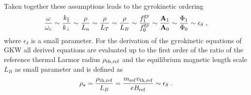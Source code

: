 Taken together these assumptions leads to the gyrokinetic ordering
\begin{gather}
	\frac{\omega}{\omega_\mathrm{c}} \sim \frac{k_\parallel}{k_\perp} \sim \frac{\rho}{L_n} \sim \frac{\rho}{L_T} \sim \frac{\rho}{L_B} \sim \frac{f^{\mathrm{gy}}_1}{f^{\mathrm{gy}}_0} \sim \frac{\boldsymbol{\mathbf{A}}_1}{\boldsymbol{\mathbf{A}}_0} \sim \frac{\Phi_1}{\Phi_0} \sim \epsilon_\delta~,
\end{gather}
where $\epsilon_\delta$ is a small parameter. For the derivation of the gyrokinetic equations of GKW all derived equations are evaluated up to the first order of the ratio of the reference thermal Larmor radius $\rho_{\mathrm{th},\mathrm{ref}}$ and the equilibrium magnetic length scale $L_B$ as small parameter and is defined as \cite{Derivation}
\begin{gather}
	\rho_\star = \frac{\rho_{\mathrm{th},\mathrm{ref}}}{L_B} = \frac{m_\mathrm{ref} v_{\mathrm{th},\mathrm{ref}}}{e B_\mathrm{ref}} \sim \epsilon_\delta ~.
	\label{eq:rhostar}
\end{gather}